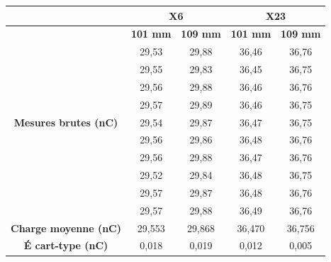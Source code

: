 \documentclass{article}
\begin{document}
\begin{table}[h]
  \centering
  \begin{tabular}{c|cc|cc|}
  \cline{2-5}
                                                           & \multicolumn{2}{c|}{\textbf{X6}} & \multicolumn{2}{c|}{\textbf{X23}} \\ \hline
  \multicolumn{1}{|c|}{\multirow{11}{*}{\textbf{Mesures brutes (nC)}}} & \textbf{101 mm} & \textbf{109 mm} & \textbf{101 mm} & \textbf{109 mm} \\ \cline{2-5} 
  \multicolumn{1}{|c|}{}                                   & 29,53           & 29,88          & 36,46           & 36,76           \\
  \multicolumn{1}{|c|}{}                                   & 29,55           & 29,83          & 36,45           & 36,75           \\
  \multicolumn{1}{|c|}{}                                   & 29,56           & 29,88          & 36,46           & 36,76           \\
  \multicolumn{1}{|c|}{}                                   & 29,57           & 29,89          & 36,46           & 36,75           \\
  \multicolumn{1}{|c|}{}                                   & 29,54           & 29,87          & 36,47           & 36,75           \\
  \multicolumn{1}{|c|}{}                                   & 29,56           & 29,86          & 36,48           & 36,76           \\
  \multicolumn{1}{|c|}{}                                   & 29,56           & 29,88          & 36,47           & 36,76           \\
  \multicolumn{1}{|c|}{}                                   & 29,52           & 29,84          & 36,48           & 36,75           \\
  \multicolumn{1}{|c|}{}                                   & 29,57           & 29,87          & 36,48           & 36,76           \\
  \multicolumn{1}{|c|}{}                                   & 29,57           & 29,88          & 36,49           & 36,76           \\ \hline
  \multicolumn{1}{|c|}{\textbf{Charge moyenne   (nC)}}     & 29,553          & 29,868         & 36,470          & 36,756          \\
  \multicolumn{1}{|c|}{\textbf{É cart-type (nC)}}           & 0,018           & 0,019          & 0,012           & 0,005           \\ \hline

\end{tabular}
\end{table}
\end{document}
